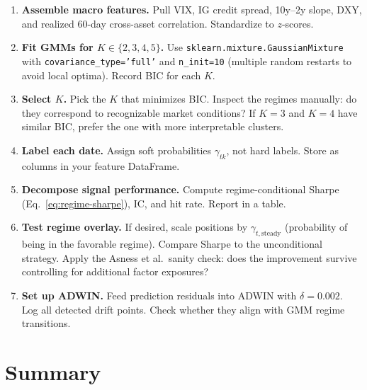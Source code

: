 \begin{enumerate}[leftmargin=1.5em]
  \item \textbf{Assemble macro features.}  Pull VIX, IG credit spread,
    10y--2y slope, DXY, and realized 60-day cross-asset correlation.
    Standardize to $z$-scores.
  \item \textbf{Fit GMMs for $K \in \{2, 3, 4, 5\}$.}  Use
    \texttt{sklearn.mixture.GaussianMixture} with
    \texttt{covariance\_type='full'} and \texttt{n\_init=10} (multiple
    random restarts to avoid local optima).  Record BIC for each $K$.
  \item \textbf{Select $K$.}  Pick the $K$ that minimizes BIC.  Inspect
    the regimes manually: do they correspond to recognizable market
    conditions?  If $K = 3$ and $K = 4$ have similar BIC, prefer the one
    with more interpretable clusters.
  \item \textbf{Label each date.}  Assign soft probabilities
    $\gamma_{tk}$, not hard labels.  Store as columns in your feature
    DataFrame.
  \item \textbf{Decompose signal performance.}  Compute
    regime-conditional Sharpe (Eq.~\ref{eq:regime-sharpe}), IC, and
    hit rate.  Report in a table.
  \item \textbf{Test regime overlay.}  If desired, scale positions by
    $\gamma_{t,\text{steady}}$ (probability of being in the favorable
    regime).  Compare Sharpe to the unconditional strategy.  Apply the
    Asness et al.\ sanity check: does the improvement survive controlling
    for additional factor exposures?
  \item \textbf{Set up ADWIN.}  Feed prediction residuals into ADWIN
    with $\delta = 0.002$.  Log all detected drift points.  Check whether
    they align with GMM regime transitions.
\end{enumerate}

\section{Summary}
\label{sec:regimes:summary}

